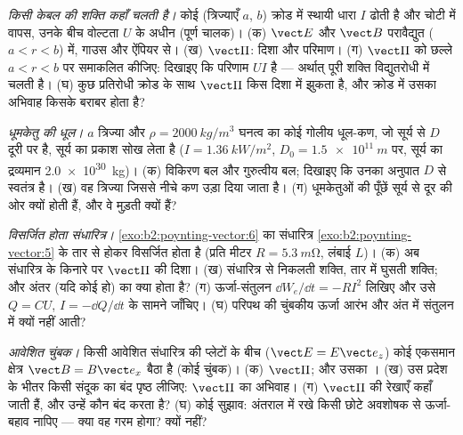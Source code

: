 \begin{exercise}[$\star\star$]\label{exo:b2:poynting-vector:8}
\emph{किसी केबल की शक्ति कहाँ चलती है।} कोई  (त्रिज्याएँ $a$,
$b$) क्रोड में स्थायी धारा $I$ ढोती है और चोटी में वापस, उनके बीच
वोल्टता $U$ के अधीन (पूर्ण चालक)। (क) $\vect E$ और $\vect B$ परावैद्युत
($a < r < b$) में, गाउस और ऐंपियर से। (ख) $\vect\Pi$:
दिशा और परिमाण। (ग) $\vect\Pi$ को छल्ले $a < r
< b$ पर समाकलित कीजिए: दिखाइए कि परिणाम $UI$ है --- अर्थात् पूरी शक्ति
विद्युतरोधी में चलती है। (घ) कुछ प्रतिरोधी क्रोड के साथ $\vect\Pi$ किस
दिशा में झुकता है, और क्रोड में उसका अभिवाह किसके बराबर होता है?
\end{exercise}

\begin{exercise}[$\star\star$]\label{exo:b2:poynting-vector:9}
\emph{धूमकेतु की धूल।} $a$ त्रिज्या और $\rho = \qty{2000}{kg/m^3}$ घनत्व का
कोई गोलीय धूल-कण, जो सूर्य से $D$ दूरी पर है, सूर्य का प्रकाश सोख
लेता है ($I = \qty{1.36}{kW/m^2}$, $D_0 = \qty{1.5e11}{m}$ पर, सूर्य का द्रव्यमान
\qty{2.0e30}{kg})। (क) विकिरण बल और गुरुत्वीय बल; दिखाइए कि
उनका अनुपात $D$ से स्वतंत्र है। (ख) वह त्रिज्या जिससे नीचे कण
उड़ा दिया जाता है। (ग) धूमकेतुओं की पूँछें सूर्य से दूर की ओर क्यों होती हैं, और वे
मुड़ती क्यों हैं?
\end{exercise}

\begin{exercise}[$\star\star\star$]\label{exo:b2:poynting-vector:10}
\emph{विसर्जित होता संधारित्र।} \cref{exo:b2:poynting-vector:6} का संधारित्र
\cref{exo:b2:poynting-vector:5} के तार से होकर विसर्जित होता है (प्रति मीटर $R = \qty{5.3}{m\ohm}$, लंबाई
$L$)। (क) अब संधारित्र के किनारे पर $\vect\Pi$ की दिशा। (ख) संधारित्र से
निकलती शक्ति, तार में घुसती शक्ति; और अंतर (यदि कोई हो) का क्या होता है? (ग) ऊर्जा-संतुलन $\dd W_e/\dd t = -RI^2$
लिखिए और उसे $Q = CU$, $I = -\dd Q/\dd t$ के सामने जाँचिए। (घ)
परिपथ की चुंबकीय ऊर्जा आरंभ और अंत में संतुलन में क्यों नहीं
आती?
\end{exercise}

\begin{exercise}[$\star\star\star$]\label{exo:b2:poynting-vector:11}
\emph{आवेशित चुंबक।} किसी आवेशित संधारित्र की प्लेटों के बीच
($\vect E = E\vect e_z$) कोई एकसमान क्षेत्र $\vect B = B\vect e_x$ बैठा है (कोई चुंबक)।
(क) $\vect\Pi$; और उसका । (ख) उस प्रदेश के भीतर किसी संदूक का बंद पृष्ठ
लीजिए: $\vect\Pi$ का अभिवाह। (ग) $\vect\Pi$ की रेखाएँ कहाँ
जाती हैं, और उन्हें कौन बंद करता है? (घ) कोई सुझाव: अंतराल में रखे किसी
छोटे अवशोषक से ऊर्जा-बहाव नापिए --- क्या वह गरम होगा? क्यों नहीं?
\end{exercise}

